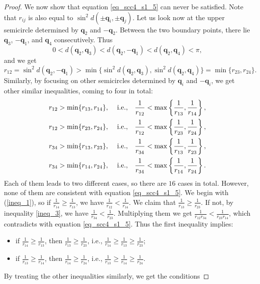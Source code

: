 \documentclass[12pt]{amsart}
\theoremstyle{definition}
\newcommand {\q} {\mathbf{q}}
\begin{document}
{\begin{proof}
We now show that equation \eqref{eq_scc4_s1_5} can never be satisfied. Note that $r_{ij}$ is also equal to $\sin^2 d(\pm\q_i, \pm \q_j)$. Let us look now at the upper semicircle determined by $\q_2$ and $-\q_2$. Between the two boundary points, there lie $\q_3$, $-\q_1$, and $\q_4$ consecutively. Thus 
 \[  0<d(\q_2, \q_3)< d(\q_2, -\q_1)<d(\q_2, \q_4)<\pi, \]
 and we get 
 \[ r_{12}= \sin^2 d(\q_2, -\q_1)> \min \{ \sin^2 d(\q_2, \q_3), \sin^2 d(\q_2, \q_4) \}= \min \{ r_{23}, r_{24} \}.  \]
 Similarly, by focusing on other semicircles determined by $\q_i$ and $-\q_i$, we get other similar inequalities, coming to four in total:
 \begin{align} 
 r_{12}&> \min \{ r_{13}, r_{14} \},  \ &{\rm i.e., }\ \ \  & \frac{1}{r_{12}}<\max  \left\{\frac{1}{r_{13}},\frac{1}{r_{14}}  \right\},  \label{ineq_1}\\
 r_{12}&> \min \{ r_{23}, r_{24} \},  \ &{\rm i.e., }\ \ \ & \frac{1}{r_{12}}<\max\left\{\frac{1}{r_{23}},\frac{1}{r_{24}}  \right\},  \label{ineq_2}\\
 r_{34}&> \min \{ r_{13}, r_{23} \},   \ & {\rm i.e., }\ \ \  & \frac{1}{r_{34}}<\max\left\{\frac{1}{r_{13}},\frac{1}{r_{23}}  \right\}, \label{ineq_3}\\
 r_{34}&> \min \{ r_{14}, r_{24} \},  \ & {\rm i.e., }\ \ \   & \frac{1}{r_{34}}<\max\left\{\frac{1}{r_{14}},\frac{1}{r_{24}}  \right\} . \label{ineq_4}
   \end{align}  
 Each of them leads to two different cases, so there are $16$ cases in total. However,  none of them are consistent with equation \eqref{eq_scc4_s1_5}.  We begin with (\ref{ineq_1}), so if $\frac{1}{r_{14}}\ge\frac{1}{r_{13}}$, we have $\frac{1}{r_{12}}<\frac{1}{r_{14}}$. We claim that $\frac{1}{r_{13}}\ge\frac{1}{r_{23}}$.   If not, by inequality \eqref{ineq_3}, we have $\frac{1}{r_{34}}<\frac{1}{r_{23}}$. Multiplying them we get  $ \frac{1}{r_{12}r_{34}}<\frac{1}{r_{23}r_{14}}$, which contradicts with    equation \eqref{eq_scc4_s1_5}. Thus the first inequality implies:
 \begin{itemize}
 \item if $\frac{1}{r_{14}}\ge\frac{1}{r_{13}}$, then $\frac{1}{r_{13}}\ge\frac{1}{r_{23}}$, i.e.,  $\frac{1}{r_{14}}\ge\frac{1}{r_{13}}\ge\frac{1}{r_{23}}$;
 \item if $\frac{1}{r_{13}}\ge\frac{1}{r_{14}}$, then $\frac{1}{r_{14}}\ge\frac{1}{r_{24}}$, i.e.,  $\frac{1}{r_{13}}\ge\frac{1}{r_{14}}\ge \frac{1}{r_{24}} $.
 \end{itemize}
By treating the other inequalities similarly, we get the conditions

\end{proof}}
\end{document}
